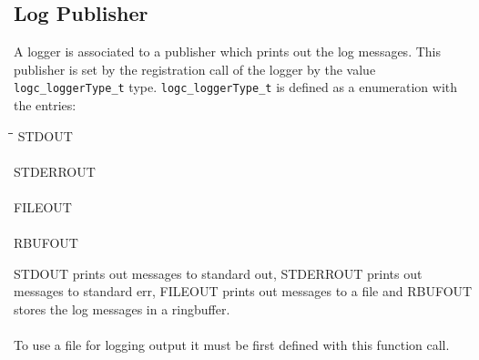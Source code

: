 \documentclass[a4paper, titlepage, 11pt]{article}
\begin{document}
\newpage

\subsection{Log Publisher}
A logger is associated to a publisher which prints out the log messages. This publisher is set by the registration call of the logger by the value \small\verb+logc_loggerType_t+ \normalsize type.\newline\newline
\small\verb+logc_loggerType_t+ \normalsize is defined as a enumeration with the entries:
\begin{tabbing}
\hspace*{1cm}\=\hspace*{2cm}\=\hspace*{0,6cm}\= \kill
\> STDOUT \\ \\
\> STDERROUT \\ \\
\> FILEOUT \\ \\
\> RBUFOUT \\
\end{tabbing}
STDOUT prints out messages to standard out, STDERROUT prints out messages to
standard err, FILEOUT prints out messages to a file and RBUFOUT stores the log
messages in a ringbuffer. \\ \\
To use a file for logging output it must be first defined with this function
call. \\ \\
\end{document}
